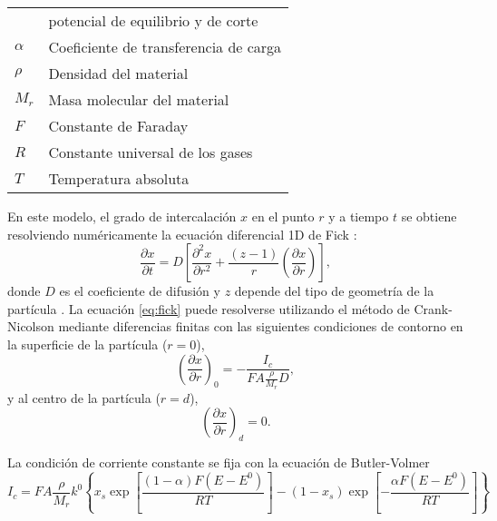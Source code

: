 \begin{table}[h!]
{\begin{tabular}{l l}
                                     & potencial de equilibrio y de corte \\
        $\alpha$ & Coeficiente de transferencia de carga \\
        $\rho$ & Densidad del material \\
        $M_r$ & Masa molecular del material \\
        $F$ & Constante de Faraday \\
        $R$ & Constante universal de los gases \\
        $T$ & Temperatura absoluta \\
        \bottomrule
    \end{tabular}
    }{}
    \label{t:params}
\end{table}

En este modelo, el grado de intercalación $x$ en el punto $r$ y a tiempo $t$ se 
obtiene resolviendo numéricamente la ecuación diferencial 1D de Fick \cite{bard-electrochemistry}:
\begin{equation}\label{eq:fick}
    \frac{\partial x}{\partial t} = D \left[ \frac{\partial^2 x}{\partial r^2} + \frac{(z - 1)}{r} \left(\frac{\partial x}{\partial r}\right) \right],
\end{equation}
donde $D$ es el coeficiente de difusión y $z$ depende del tipo de geometría de la 
partícula \cite{vassiliev2016}. La ecuación \ref{eq:fick} puede resolverse 
utilizando el método de Crank-Nicolson mediante diferencias finitas 
\cite{crank-nicolson} con las siguientes condiciones de contorno en la superficie
de la partícula ($r = 0$),
\begin{equation}
    \left(\frac{\partial x}{\partial r}\right)_0 = - \frac{I_c}{F A \frac{\rho}{M_r}D},
\end{equation}
y al centro de la partícula ($r = d$),
\begin{equation}
    \left(\frac{\partial x}{\partial r}\right)_d = 0.
\end{equation}

La condición de corriente constante se fija con la ecuación de Butler-Volmer \cite{bard-electrochemistry}
\begin{equation}\label{eq:bv}
    I_c = F A \frac{\rho}{M_r} k^0 \left\{x_s \exp\left[ \frac{(1-\alpha)F(E-E^0)}{RT} \right] - (1 - x_s) \exp\left[ -\frac{\alpha F (E-E^0)}{RT} \right] \right\}
\end{equation}

